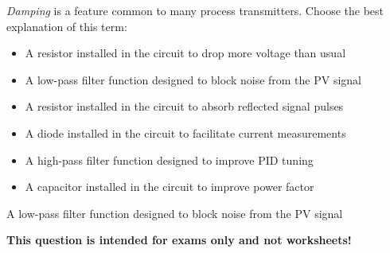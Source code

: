 

{\it Damping} is a feature common to many process transmitters.  Choose the best explanation of this term:

\vskip 10pt

\begin{itemize}
\item{} A resistor installed in the circuit to drop more voltage than usual
\vskip 10pt
\item{} A low-pass filter function designed to block noise from the PV signal
\vskip 10pt
\item{} A resistor installed in the circuit to absorb reflected signal pulses
\vskip 10pt
\item{} A diode installed in the circuit to facilitate current measurements
\vskip 10pt
\item{} A high-pass filter function designed to improve PID tuning
\vskip 10pt
\item{} A capacitor installed in the circuit to improve power factor
\end{itemize}







A low-pass filter function designed to block noise from the PV signal







{\bf This question is intended for exams only and not worksheets!}



